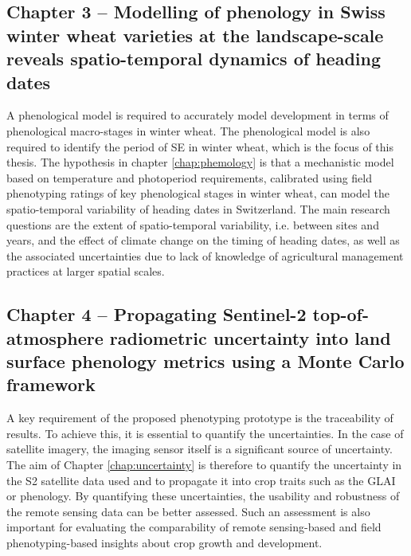 \subsection*{Chapter 3 -- Modelling of phenology in Swiss winter wheat varieties at the landscape-scale reveals spatio-temporal dynamics of heading dates}
A phenological model is required to accurately model development in terms of phenological macro-stages in winter wheat. The phenological model is also required to identify the period of \gls{SE} in winter wheat, which is the focus of this thesis. The hypothesis in chapter \ref{chap:phemology} is that a mechanistic model based on temperature and photoperiod requirements, calibrated using field phenotyping ratings of key phenological stages in winter wheat, can model the spatio-temporal variability of heading dates in Switzerland. The main research questions are the extent of spatio-temporal variability, i.e. between sites and years, and the effect of climate change on the timing of heading dates, as well as the associated uncertainties due to lack of knowledge of agricultural management practices at larger spatial scales.

\subsection*{Chapter 4 -- Propagating Sentinel-2 top-of-atmosphere radiometric uncertainty into land surface phenology metrics using a Monte Carlo framework}
A key requirement of the proposed phenotyping prototype is the traceability of results. To achieve this, it is essential to quantify the uncertainties. In the case of satellite imagery, the imaging sensor itself is a significant source of uncertainty. The aim of Chapter \ref{chap:uncertainty} is therefore to quantify the uncertainty in the \gls{S2} satellite data used and to propagate it into crop traits such as the \gls{GLAI} or phenology. By quantifying these uncertainties, the usability and robustness of the remote sensing data can be better assessed. Such an assessment is also important for evaluating the comparability of remote sensing-based and field phenotyping-based insights about crop growth and development.

